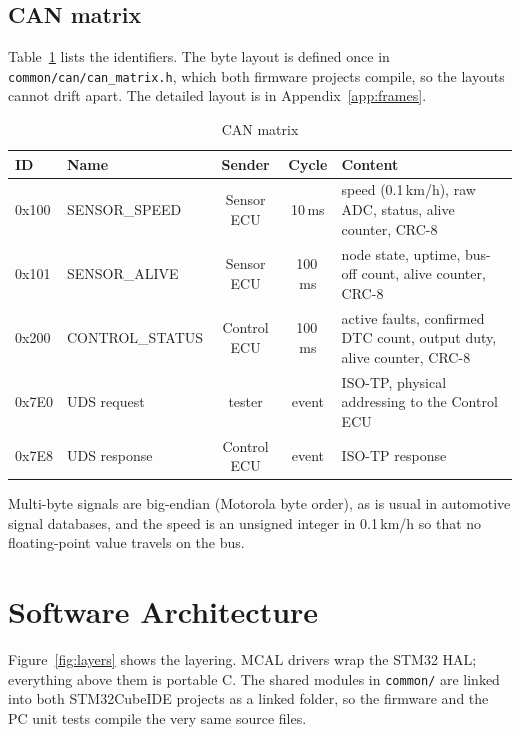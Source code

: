 \subsection{CAN matrix}

Table~\ref{tab:canmatrix} lists the identifiers. The byte layout is defined once in \texttt{common/can/can\_matrix.h}, which both firmware projects compile, so the layouts cannot drift apart. The detailed layout is in Appendix~\ref{app:frames}.

\begin{table}[H]
\centering
\small
\caption{CAN matrix}
\label{tab:canmatrix}
\begin{tabularx}{\textwidth}{@{}llccX@{}}
\toprule
\textbf{ID} & \textbf{Name} & \textbf{Sender} & \textbf{Cycle} & \textbf{Content} \\
\midrule
0x100 & SENSOR\_SPEED & Sensor ECU & 10\,ms & speed (0.1\,km/h), raw ADC, status, alive counter, CRC-8 \\
0x101 & SENSOR\_ALIVE & Sensor ECU & 100\,ms & node state, uptime, bus-off count, alive counter, CRC-8 \\
0x200 & CONTROL\_STATUS & Control ECU & 100\,ms & active faults, confirmed DTC count, output duty, alive counter, CRC-8 \\
0x7E0 & UDS request & tester & event & ISO-TP, physical addressing to the Control ECU \\
0x7E8 & UDS response & Control ECU & event & ISO-TP response \\
\bottomrule
\end{tabularx}
\end{table}

Multi-byte signals are big-endian (Motorola byte order), as is usual in automotive signal databases, and the speed is an unsigned integer in 0.1\,km/h so that no floating-point value travels on the bus.

\section{Software Architecture}

Figure~\ref{fig:layers} shows the layering. MCAL drivers wrap the STM32 HAL; everything above them is portable C. The shared modules in \texttt{common/} are linked into both STM32CubeIDE projects as a linked folder, so the firmware and the PC unit tests compile the very same source files.

